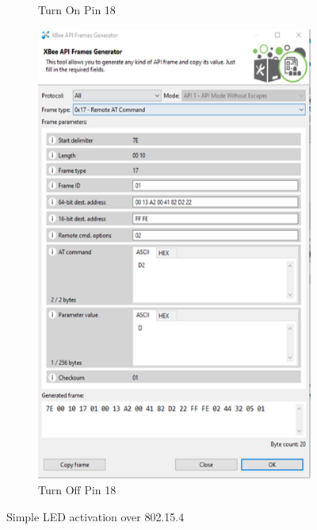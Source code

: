 \documentclass[letter,twocolumn]{report}
\begin{document}
\begin{figure}[h!]
\begin{subfigure}[t]{0.22\textwidth}
			\caption{Turn On Pin 18}
		\end{subfigure}
		\begin{subfigure}[t]{0.22\textwidth}
			\centering
			\includegraphics[width=\textwidth]{xbeeXctu1.png}
			\caption{Turn Off Pin 18}
		\end{subfigure}
		\caption{Simple LED activation over 802.15.4}
	\end{figure}
\end{document}
